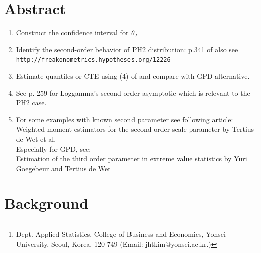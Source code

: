 \documentclass[11pt]{article}
\title{}
\author{Joseph H. T. Kim\footnote{Dept. Applied Statistics, College of Business and Economics, Yonsei University, Seoul, Korea, 120-749 (Email: jhtkim@yonsei.ac.kr.) }\quad  }
\begin{document}
\maketitle
\newtheorem{thm}{Theorem}[section]
\newtheorem{cor}[thm]{Corollary}
\newtheorem{lem}{Lemma}
\newtheorem{prop}[thm]{Proposition}
\newtheorem{defn}[thm]{Definition}
\newtheorem{exam}[thm]{Example}

\section*{Abstract}
\begin{enumerate}
\item Construct the confidence interval for $\theta_T$
\item Identify the second-order behavior of PH2 distribution: p.341 of \cite{embr+klup+milk:97} also see\\
\verb"http://freakonometrics.hypotheses.org/12226"
\item Estimate quantiles or CTE using (4) of \cite{McNei+Salad:97a} and compare with GPD alternative.
\item See \cite{Drees+De-Ha+etal:00a} p. 259 for Loggamma's second order asymptotic which is relevant to the PH2 case. 
\item For some examples with known second parameter see following article:\\
Weighted moment estimators for the second order scale parameter by Tertius de Wet et al.\\
Especially for GPD, see:\\
Estimation of the third order parameter in extreme value statistics by Yuri Goegebeur and Tertius de Wet
\end{enumerate}

\newpage
\section{Background}
\end{document}
